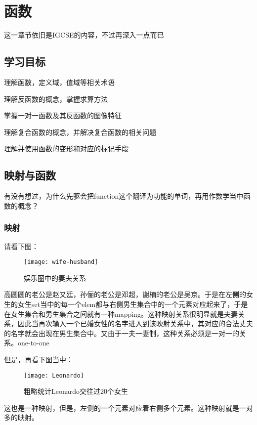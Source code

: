 \chapter{函数}
\label{ch:Functions}
这一章节依旧是IGCSE的内容，不过再深入一点而已


\section*{学习目标}
\begin{todolist}
\item 理解函数，定义域，值域等相关术语
\item 理解反函数的概念，掌握求算方法
\item 掌握一对一函数及其反函数的图像特征
\item 理解复合函数的概念，并解决复合函数的相关问题
\item 理解并使用函数的变形和对应的标记手段
\end{todolist}
\clearpage

\section{映射与函数}
\label{sec:Mapping and function}
有没有想过，为什么先驱会把function这个翻译为功能的单词，再用作数学当中函数的概念？

\subsection*{映射}
\label{subsec:Mapping}
请看下图：

\begin{figure}[H]
\centering
\texttt{[image: wife-husband]}
\caption{娱乐圈中的妻夫关系}
\end{figure}

高圆圆的老公是赵又廷，孙俪的老公是邓超，谢楠的老公是吴京。于是在左侧的女生的女生\gls{set}当中的每一个\gls{elem}都与右侧男生集合中的一个元素对应起来了，于是在女生集合和男生集合之间就有一种\gls{mapping}。这种映射关系很明显就是夫妻关系，因此当再次输入一个已婚女性的名字进入到该映射关系中，其对应的合法丈夫的名字就会出现在男生集合中。又由于一夫一妻制，这种关系必须是一对一的关系。one-to-one

但是，再看下图当中：
\begin{figure}[H]
\centering
\texttt{[image: Leonardo]}
\caption{粗略统计Leonardo交往过20个女生}
\end{figure}

这也是一种映射，但是，左侧的一个元素对应着右侧多个元素。这种映射就是一对多的映射。

